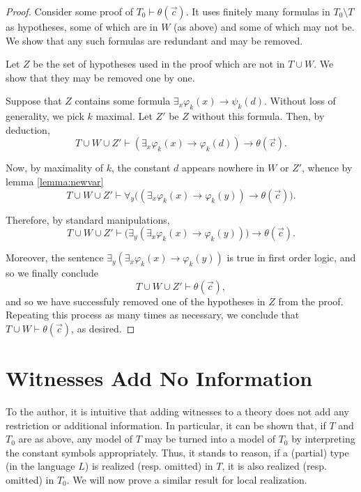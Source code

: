 \documentclass{article}
\theoremstyle{nonumberplain}
\newtheorem{proof}{Proof}
\begin{document}
\begin{proof}
Consider some proof of $T_0 \vdash \theta(\vec c)$. It uses finitely many formulas in $T_0 \setminus T$ as hypotheses, some of which are in $W$ (as above) and some of which may not be. We show that any such formulas are redundant and may be removed.

Let $Z$ be the set of hypotheses used in the proof which are not in $T \cup W$. We show that they may be removed one by one.

Suppose that $Z$ contains some formula $\exists_x \varphi_k(x) \rightarrow \psi_k(d)$. Without loss of generality, we pick $k$ maximal. Let $Z'$ be $Z$ without this formula. Then, by deduction,
\begin{equation}
T \cup W \cup Z' \vdash (\exists_x \varphi_k(x) \rightarrow \varphi_k(d)) \rightarrow \theta(\vec c).
\end{equation}

Now, by maximality of $k$, the constant $d$ appears nowhere in $W$ or $Z'$, whence by lemma \ref{lemma:newvar}
\begin{equation}
T \cup W \cup Z' \vdash \forall_y \big((\exists_x \varphi_k(x) \rightarrow \varphi_k(y)) \rightarrow \theta(\vec c) \big).
\end{equation}

Therefore, by standard manipulations,
\begin{equation}
T \cup W \cup Z' \vdash \big(\exists_y (\exists_x \varphi_k(x) \rightarrow \varphi_k(y))\big) \rightarrow \theta(\vec c).
\end{equation}

Moreover, the sentence $\exists_y(\exists_x \varphi_k(x) \rightarrow \varphi_k(y))$ is true in first order logic, and so we finally conclude
\begin{equation}
T \cup W \cup Z' \vdash \theta(\vec c),
\end{equation}
and so we have successfuly removed one of the hypotheses in $Z$ from the proof. Repeating this process as many times as necessary, we conclude that $T \cup W \vdash \theta(\vec c)$, as desired.
\end{proof}

\section{Witnesses Add No Information}

To the author, it is intuitive that adding witnesses to a theory does not add any restriction or additional information. In particular, it can be shown that, if $T$ and $T_0$ are as above, any model of $T$ may be turned into a model of $T_0$ by interpreting the constant symbols appropriately. Thus, it stands to reason, if a (partial) type (in the language $L$) is realized (resp. omitted) in $T$, it is also realized (resp. omitted) in $T_0$. We will now prove a similar result for local realization.
\end{document}

